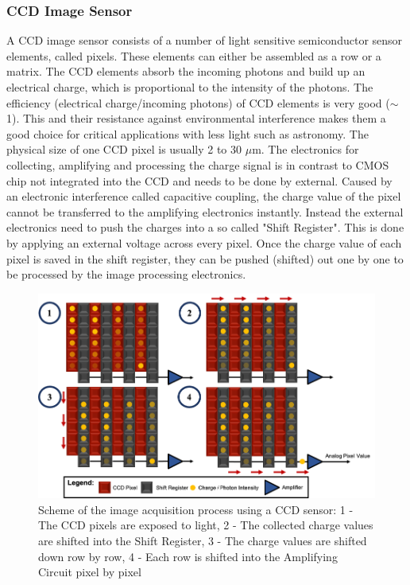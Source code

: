 \subsubsection{CCD Image Sensor}
A CCD image sensor consists of a number of light sensitive semiconductor sensor elements, called pixels. These elements can either be assembled as a row or a matrix. The CCD elements absorb the incoming photons and build up an electrical charge, which is proportional to the intensity of the photons. The efficiency (electrical charge/incoming photons) of CCD elements is very good ($\sim$1). This and their resistance against environmental interference makes them a good choice for critical applications with less light such as astronomy. The physical size of one CCD pixel is usually 2 to 30 $\mu$m. The electronics for collecting, amplifying and processing the charge signal is in contrast to CMOS chip not integrated into the CCD and needs to be done by external. Caused by an electronic interference called capacitive coupling, the charge value of the pixel cannot be transferred to the amplifying electronics instantly. Instead the external electronics need to push the charges into a so called "Shift Register". This is done by applying an external voltage across every pixel. Once the charge value of each pixel is saved in the shift register, they can be pushed (shifted) out one by one to be processed by the image processing electronics.\cite{LoefflerLang2020}

\begin{figure}
\begin{center}
\includegraphics[width=12cm]{Pictures/CCDShifting}
\caption[Scheme of the image acquisition process using a CCD sensor]{Scheme of the image acquisition process using a CCD sensor: 1 - The CCD pixels are exposed to light, 2 - The collected charge values are shifted into the Shift Register, 3 - The charge values are shifted down row by row, 4 - Each row is shifted into the Amplifying Circuit pixel by pixel}
\label{CCDShifting}
\end{center}
\end{figure}

